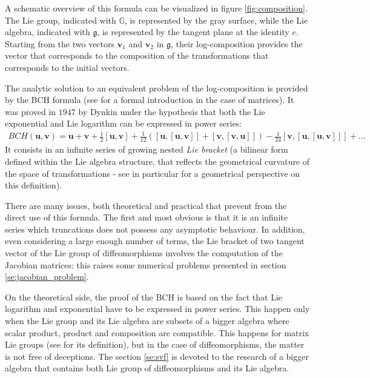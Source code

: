 A schematic overview of this formula can be visualized in figure \ref{fig:composition}. The Lie group, indicated with $\mathbb{G}$, is represented by the gray surface, while the Lie algebra, indicated with $\mathfrak{g}$, is represented by the tangent plane at the identity $e$.
Starting from the two vectors $\mathbf{v}_1$ and $\mathbf{v}_2$ in $\mathfrak{g}$, their log-composition provides the vector that corresponds to the composition of the transformations that corresponds to the initial vectors. 

% 
The analytic solution to an equivalent problem of the log-composition is provided by the BCH formula (see \cite{hall2015lie} for a formal introduction in the case of matrices). It was proved in $1947$ by Dynkin \cite{dynkin1947calculation} under the hypothesis that both the Lie exponential and Lie logarithm can be expressed in power series:
\begin{align*}
BCH(\mathbf{u},\mathbf{v}) 
= 
\mathbf{u} + \mathbf{v} + \frac{1}{2}[\mathbf{u},\mathbf{v}] + \frac{1}{12}([\mathbf{u},[\mathbf{u},\mathbf{v}]]
+ [\mathbf{v},[\mathbf{v},\mathbf{u}]]) - \frac{1}{24}[\mathbf{v},[\mathbf{u},[\mathbf{u},\mathbf{v}]]] +... 
\end{align*}
It consists in an infinite series of growing nested \emph{Lie bracket} (a bilinear form defined within the Lie algebra structure, that reflects the geometrical curvature of the space of transformations - see in particular \cite{misner1973gravitation} for a geometrical perspective on this definition).

There are many issues, both theoretical and practical that prevent from the direct use of this formula. The first and most obvious is that it is an infinite series which truncations does not possess any asymptotic behaviour.
In addition, even considering a large enough number of terms, the Lie bracket of two tangent vector of the Lie group of diffeomorphisms involves the computation of the Jacobian matrices: this raises some numerical problems presented in section \ref{se:jacobian_problem}.

On the theoretical side, the proof of the BCH is based on the fact that Lie logarithm and exponential have to be expressed in power series. This happen only when the Lie group and its Lie algebra are subsets of a bigger algebra where scalar product, product and composition are compatible. This happens for matrix Lie groups (see \cite{hall2015lie} for its definition), but in the case of diffeomorphisms, the matter is not free of deceptions. The section \ref{se:svf} is devoted to the research of a bigger algebra that contains both Lie group of diffeomorphisms and its Lie algebra.
 
